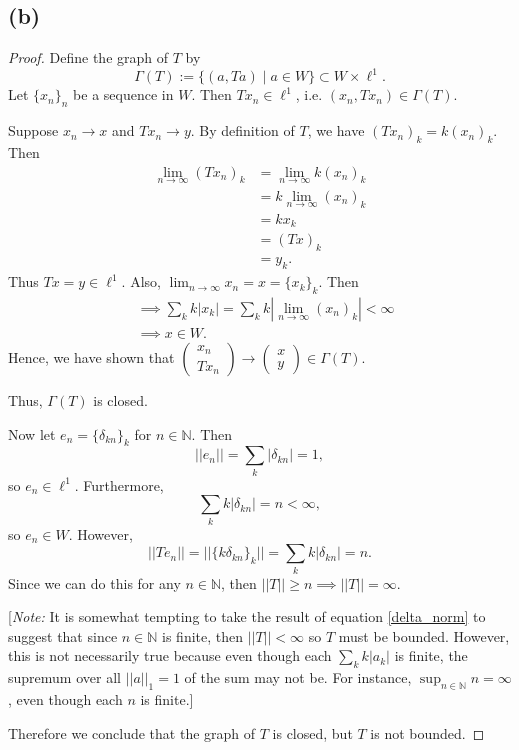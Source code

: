 \documentclass{article}
\begin{document}
\subsection*{(b)}
\begin{proof}
	Define the graph of $T$ by 
	\begin{equation}
		\Gamma (T) := \{(a, Ta) \; | \; a\in W\} \subset W\times \ell^1.
	\end{equation}
	Let $\{x_n\}_n$ be a sequence in $W$. Then $Tx_n \in \ell^1$, i.e. $(x_n, Tx_n) \in \Gamma (T)$.
	
	Suppose $x_n \rightarrow x$ and $Tx_n \rightarrow y$. By definition of $T$, we have $(Tx_n)_k = k (x_n)_k$. Then
	\begin{align}
		\lim_{n\to\infty}(Tx_n)_k &= \lim_{n\to\infty} k(x_n)_k\\
		&= k \lim_{n\to\infty}(x_n)_k \\
		&= k x_k \\
		&= (Tx)_k\\
		&= y_k.
	\end{align}
	Thus $Tx=y\in \ell^1$. Also, $\lim_{n\to\infty} x_n = x = \{x_k\}_k$. Then
	\begin{align}
		&\implies \sum_k k |x_k| = \sum_k k |\lim_{n\to\infty}(x_n)_k| < \infty\\
		&\implies x \in W.
	\end{align}
	Hence, we have shown that $\begin{pmatrix} x_n\\ Tx_n \end{pmatrix} \rightarrow \begin{pmatrix} x\\ y \end{pmatrix} \in \Gamma (T)$.
	
	Thus, $\Gamma(T)$ is closed.
	
	Now let $e_n = \{\delta_{kn}\}_k$ for $n\in\mathbb{N}$. Then 
	\begin{equation}
		||e_n|| = \sum_{k}|\delta_{kn}| = 1,
	\end{equation}
	so $e_n \in \ell^1$. Furthermore,
	\begin{equation}
		\sum_{k}k|\delta_{kn}| = n < \infty,
	\end{equation}
	so $e_n \in W$. However,
	\begin{equation}\label{delta_norm}
		||Te_n|| = ||\{k\delta_{kn}\}_k|| = \sum_{k}k|\delta_{kn}| = n.
	\end{equation}
	Since we can do this for any $n\in\mathbb{N}$, then $||T||\geq n \implies ||T||=\infty$.
	
	[\textit{Note:} It is somewhat tempting to take the result of equation \eqref{delta_norm} to suggest that since $n\in\mathbb{N}$ is finite, then $||T||<\infty$ so $T$ must be bounded. However, this is not necessarily true because even though each $\sum_k k |a_k|$ is finite, the supremum over all $||a||_1 = 1$ of the sum may not be. For instance, $\sup_{n\in \mathbb{N}} n = \infty$, even though each $n$ is finite.]
	
	Therefore we conclude that the graph of $T$ is closed, but $T$ is not bounded.
	
\end{proof}
\end{document}
